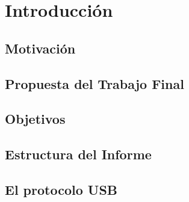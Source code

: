 \chapter{Introducción}
	\label{cap:int}
	
	\section{Motivación}
		\label{int:mot}
		
	\section{Propuesta del Trabajo Final}
		\label{int:pro}
		
	\section{Objetivos}
		\label{int:obj}
		
	\section{Estructura del Informe}
		\label{int:est}
		
	\section{El protocolo USB}
		
 
 
%	
%	